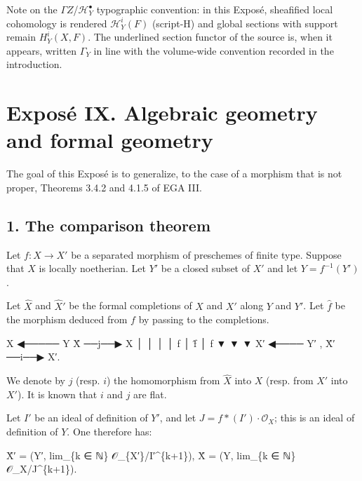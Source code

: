 \documentclass[
]{article}
\newenvironment{Shaded}{}{}
\newcommand{\NormalTok}[1]{#1}
\begin{document}
Note on the \(\Gamma Z\)/\(\mathcal{H}^{\bullet}_{Y}\) typographic
convention: in this Exposé, sheafified local cohomology is rendered
\(\mathcal{H}^{i}_{Y}(F)\) (script-H) and global sections with support
remain \(H^{i}_{Y}(X, F)\). The underlined section functor of the source
is, when it appears, written \(\Gamma_{Y}\) in line with the volume-wide
convention recorded in the introduction.

\section{Exposé IX. Algebraic geometry and formal
geometry}\label{exposuxe9-ix.-algebraic-geometry-and-formal-geometry}

The goal of this Exposé is to generalize, to the case of a morphism that
is not proper, Theorems 3.4.2 and 4.1.5 of EGA III.

\subsection{1. The comparison theorem}\label{the-comparison-theorem}

Let \(f: X \to X'\) be a separated morphism of preschemes of finite
type. Suppose that \(X\) is locally noetherian. Let \(Y'\) be a closed
subset of \(X'\) and let \(Y = f^{-1}(Y')\).

Let \(\hat{X}\) and \(\hat{X}'\) be the formal completions of \(X\) and
\(X'\) along \(Y\) and \(Y'\). Let \(\hat{f}\) be the morphism deduced
from \(f\) by passing to the completions.

\begin{Shaded}
\begin{Highlighting}[]
\NormalTok{    X ◀───── Y               X̂ ──j──▶  X}
\NormalTok{    │                        │           │}
\NormalTok{    │ f                      │ f̂         │ f}
\NormalTok{    ▼                        ▼           ▼}
\NormalTok{    X′ ◀──── Y′      ,       X̂′ ──i──▶ X′.}
\end{Highlighting}
\end{Shaded}

We denote by \(j\) (resp. \(i\)) the homomorphism from \(\hat{X}\) into
\(X\) (resp. from \(\hat{X}'\) into \(X'\)). It is known that \(i\) and
\(j\) are flat.

Let \(I'\) be an ideal of definition of \(Y'\), and let
\(J = f*(I')\cdot \mathcal{O}_{X}\); this is an ideal of definition of
\(Y\). One therefore has:

\begin{Shaded}
\begin{Highlighting}[]
\NormalTok{X̂′ = (Y′, lim\_\{k ∈ ℕ\} 𝒪\_\{X′\}/I′\^{}\{k+1\}),    X̂ = (Y, lim\_\{k ∈ ℕ\} 𝒪\_X/J\^{}\{k+1\}).}
\end{Highlighting}
\end{Shaded}
\end{document}
